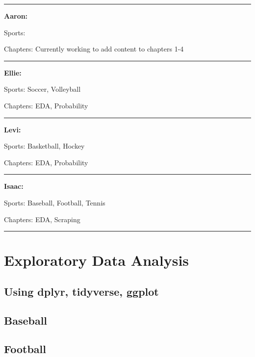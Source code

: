 \documentclass[
]{book}
\theoremstyle{definition}
\theoremstyle{definition}
\theoremstyle{definition}
\theoremstyle{definition}
\theoremstyle{remark}
\begin{document}
\begin{center}\rule{0.5\linewidth}{0.5pt}\end{center}

\textbf{Aaron:}

Sports:

Chapters: Currently working to add content to chapters 1-4

\begin{center}\rule{0.5\linewidth}{0.5pt}\end{center}

\textbf{Ellie:}

Sports: Soccer, Volleyball

Chapters: EDA, Probability

\begin{center}\rule{0.5\linewidth}{0.5pt}\end{center}

\textbf{Levi:}

Sports: Basketball, Hockey

Chapters: EDA, Probability

\begin{center}\rule{0.5\linewidth}{0.5pt}\end{center}

\textbf{Isaac:}

Sports: Baseball, Football, Tennis

Chapters: EDA, Scraping

\begin{center}\rule{0.5\linewidth}{0.5pt}\end{center}

\hypertarget{exploratory-data-analysis}{%
\chapter{Exploratory Data Analysis}\label{exploratory-data-analysis}}

\hypertarget{using-dplyr-tidyverse-ggplot}{%
\section{Using dplyr, tidyverse, ggplot}\label{using-dplyr-tidyverse-ggplot}}

\hypertarget{baseball}{%
\section{Baseball}\label{baseball}}

\hypertarget{football}{%
\section{Football}\label{football}}
\end{document}
